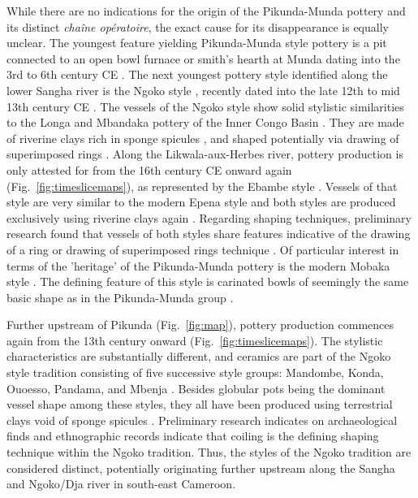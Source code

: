\documentclass[smallextended,natbib]{svjour3}       %
\begin{document}
While there are no indications for the origin of the Pikunda-Munda pottery and its distinct \textit{chaîne opératoire}, the exact cause for its disappearance is equally unclear. The youngest feature yielding Pikunda-Munda style pottery is a pit connected to an open bowl furnace or smith's hearth at Munda dating into the 3rd to 6th century CE \citep[335--339 Fig.~170]{Seidensticker.2021e}. The next youngest pottery style identified along the lower Sangha river is the Ngoko style \citep[Fig.~\ref{fig:timeslicemaps};][125--128]{Seidensticker.2021e}, recently dated into the late 12th to mid 13th century CE \citep[Tab.~1]{Seidensticker.Submitted}. The vessels of the Ngoko style show solid stylistic similarities to the Longa and Mbandaka pottery of the Inner Congo Basin \citep[121--128,139--143]{Wotzka.1995}. They are made of riverine clays rich in sponge spicules \citep{Seidensticker.2020}, and shaped potentially via drawing of superimposed rings \citep[52--53 Fig.~15]{Seidensticker.2021e}. Along the Likwala-aux-Herbes river, pottery production is only attested for from the 16th century CE onward again (Fig.~\ref{fig:timeslicemaps}), as represented by the Ebambe style \citep[131--136]{Seidensticker.2021e}. Vessels of that style are very similar to the modern Epena style \citep[137--141]{Seidensticker.2021e} and both styles are produced exclusively using riverine clays again \citep{Seidensticker.2020}. Regarding shaping techniques, preliminary research found that vessels of both styles share features indicative of the drawing of a ring or drawing of superimposed rings technique \citep[55--57 Fig.~17--18]{Seidensticker.2021e}. Of particular interest in terms of the 'heritage' of the Pikunda-Munda pottery is the modern Mobaka style \citep[141--144]{Seidensticker.2021e}. The defining feature of this style is carinated bowls of seemingly the same basic shape as in the Pikunda-Munda group \citep[142 Fig.~63.1,64]{Seidensticker.2021e}.

Further upstream of Pikunda (Fig.~\ref{fig:map}), pottery production commences again from the 13th century onward (Fig.~\ref{fig:timeslicemaps}). The stylistic characteristics are substantially different, and ceramics are part of the Ngoko style tradition consisting of five successive style groups: Mandombe, Konda, Ouoesso, Pandama, and Mbenja \citep[145--162]{Seidensticker.2021e}. Besides globular pots being the dominant vessel shape among these styles, they all have been produced using terrestrial clays void of sponge spicules \citep{Seidensticker.2020}. Preliminary research indicates on archaeological finds \citep[53--54 Fig.~16B]{Seidensticker.2021e} and ethnographic records indicate that coiling is the defining shaping technique within the Ngoko tradition. Thus, the styles of the Ngoko tradition are considered distinct, potentially originating further upstream along the Sangha and Ngoko/Dja river in south-east Cameroon. 
\end{document}
